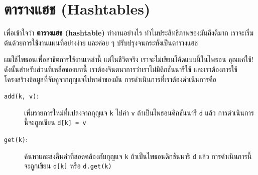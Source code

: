 \section[ตารางแฮช]{ตารางแฮช (Hashtables)} %
\label{hashtable}


เพื่อเข้าใจว่า \textbf{ตารางแฮช (hashtable)} ทำงานอย่างไร 
ทำไมประสิทธิภาพของมันถึงดีมาก เราจะเริ่มต้นด้วยการใช้งานแผนที่อย่างง่าย และค่อย ๆ ปรับปรุงจนกระทั่งเป็นตารางแฮช 


ผมใช้ไพธอนเพื่อสาธิตการใช้งานเหล่านี้ แต่ในชีวิตจริง เราจะไม่เขียนโค้ดแบบนี้ในไพธอน 
คุณแค่ใช้! 
ดังนั้นสำหรับส่วนที่เหลือของบทนี้ เราต้องจินตนาการว่าเราไม่มีดิกชันนารีใช้
และเราต้องการใช้โครงสร้างข้อมูลที่จับคู่จากกุญแจไปหาค่าของมัน การดำเนินการที่เราต้องดำเนินการคือ

\begin{description}


\item[{\tt add(k, v)}:] เพิ่มรายการใหม่ที่แปลงจากกุญแจ {\tt k} ไปค่า {\tt v} 
ถ้าเป็นไพธอนดิกชันนารี {\tt d} แล้ว การดำเนินการนี้จะถูกเขียน {\tt d[k] = v}


\item[{\tt get(k)}:] ค้นหาและส่งคืนค่าที่สอดคล้องกับกุญแจ {\tt k} 
ถ้าเป็นไพธอนดิกชันนารี {\tt d} แล้ว การดำเนินการนี้จะถูกเขียน {\tt d[k]} หรือ {\tt d.get(k)}

\end{description}

